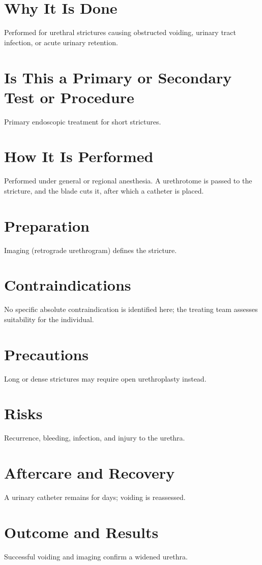 \section*{Why It Is Done}
Performed for urethral strictures causing obstructed voiding, urinary tract infection, or acute urinary retention.

\section*{Is This a Primary or Secondary Test or Procedure}
Primary endoscopic treatment for short strictures.

\section*{How It Is Performed}
Performed under general or regional anesthesia. A urethrotome is passed to the stricture, and the blade cuts it, after which a catheter is placed.

\section*{Preparation}
Imaging (retrograde urethrogram) defines the stricture.

\section*{Contraindications}
No specific absolute contraindication is identified here; the treating team assesses suitability for the individual.

\section*{Precautions}
Long or dense strictures may require open urethroplasty instead.

\section*{Risks}
Recurrence, bleeding, infection, and injury to the urethra.

\section*{Aftercare and Recovery}
A urinary catheter remains for days; voiding is reassessed.

\section*{Outcome and Results}
Successful voiding and imaging confirm a widened urethra.

